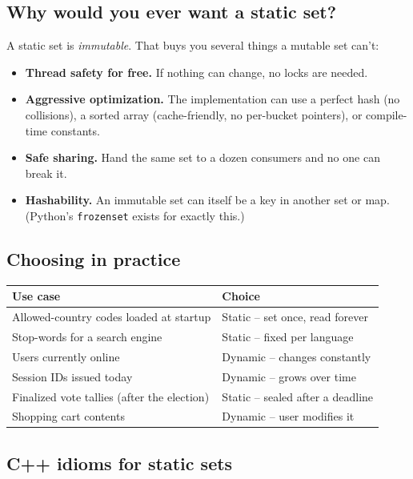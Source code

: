\documentclass[11pt]{article}
\begin{document}
\subsection*{Why would you ever want a static set?}

\begin{ideabox}
A static set is \emph{immutable}. That buys you several things a mutable set can't:
\begin{itemize}[leftmargin=*]
    \item \textbf{Thread safety for free.} If nothing can change, no locks are needed.
    \item \textbf{Aggressive optimization.} The implementation can use a perfect hash (no collisions), a sorted array (cache-friendly, no per-bucket pointers), or compile-time constants.
    \item \textbf{Safe sharing.} Hand the same set to a dozen consumers and no one can break it.
    \item \textbf{Hashability.} An immutable set can itself be a key in another set or map. (Python's \texttt{frozenset} exists for exactly this.)
\end{itemize}
\end{ideabox}

\subsection*{Choosing in practice}

\begin{center}
\begin{tabular}{ll}
\hline
Use case & Choice \\
\hline
Allowed-country codes loaded at startup & Static -- set once, read forever \\
Stop-words for a search engine & Static -- fixed per language \\
Users currently online & Dynamic -- changes constantly \\
Session IDs issued today & Dynamic -- grows over time \\
Finalized vote tallies (after the election) & Static -- sealed after a deadline \\
Shopping cart contents & Dynamic -- user modifies it \\
\hline
\end{tabular}
\end{center}

\subsection*{C++ idioms for static sets}
\end{document}
